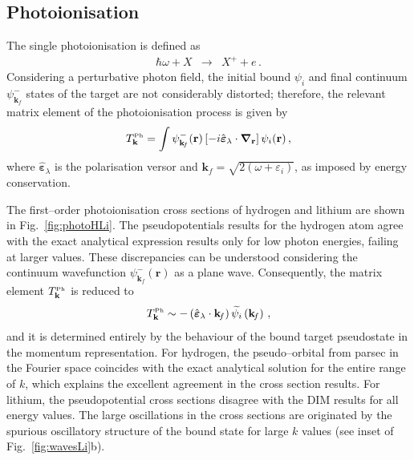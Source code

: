 \documentclass[10pt]{article}
\begin{document}
\subsection{Photoionisation}
\label{sec:photoatom}

The single photoionisation is defined as
\begin{eqnarray}
 \hbar\omega + X &\rightarrow& X^+ + e\,.
\end{eqnarray}
Considering a perturbative photon field, the initial bound $\psi_{i}$ 
and final continuum $\psi_{\mathbf{k}_{\!f}}^-$ states of the target 
are not considerably distorted; therefore, the relevant matrix 
element of the photoionisation process is given by
\begin{equation}
 T_{\mathbf{k}}^{\mbox{\tiny Ph}} = \int{
 \psi_{\mathbf{k}_{\!f}}^-(\mathbf{r}) 
 \left[-i \hat{\boldsymbol{\varepsilon}}_\lambda \cdot 
 \boldsymbol{\nabla}_\mathbf{r}\right] 
 \psi_{i}(\mathbf{r})}\,,
\end{equation}
where $\hat{\boldsymbol{\varepsilon}}_\lambda$ is the polarisation 
versor and $\mathbf{k}_{\!f}=\sqrt{2(\omega+\varepsilon_i)}$, as 
imposed by energy conservation.

The first--order photoionisation cross sections of hydrogen and 
lithium are shown in Fig.~\ref{fig:photoHLi}. The pseudopotentials 
results for the hydrogen atom agree with the exact analytical 
expression results only for low photon energies, failing at larger 
values. These discrepancies can be understood considering the 
continuum wavefunction $\psi_{\mathbf{k}_{\!f}}^-(\mathbf{r})$ as a 
plane wave. Consequently, the matrix element 
$T_{\mathbf{k}}^{\mbox{\tiny Ph}}$ is reduced to
\begin{equation}
 T_{\mathbf{k}}^{\mbox{\tiny Ph}} \sim 
 -\left(\hat{\boldsymbol{\varepsilon}}_\lambda \cdot \mathbf{k}_{\!f} \right)
 \widetilde{\psi_i} \left(\mathbf{k}_{\!f}\right)\,,
\end{equation}
and it is determined entirely by the behaviour of the bound target 
pseudostate in the momentum representation. For hydrogen, the 
pseudo--orbital from {\sc parsec} in the Fourier space coincides with 
the exact analytical solution for the entire range of $k$, which 
explains the excellent agreement in the cross section results. For 
lithium, the pseudopotential cross sections disagree with the DIM 
results for all energy values. The large oscillations in the cross 
sections are originated by the spurious oscillatory structure of the 
bound state for large $k$ values (see inset of 
Fig.~\ref{fig:wavesLi}b).
\end{document}
